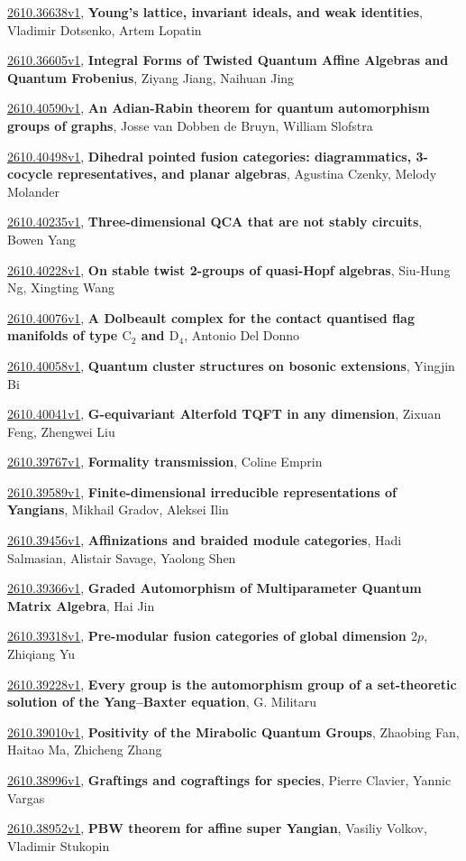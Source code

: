\documentclass[9pt, a4paper]{article}
\theoremstyle{plain}
\theoremstyle{definition}
\theoremstyle{remark}
\newcommand{\arxiv}[3]{\href{https://arxiv.org/abs/#1}{#1}, \textbf{\textcolor{arxivblue}{#2}}, #3}
\begin{document}
\arxiv{2610.36638v1}{Young's lattice, invariant ideals, and weak identities}{Vladimir Dotsenko, Artem Lopatin}

\arxiv{2610.36605v1}{Integral Forms of Twisted Quantum Affine Algebras and Quantum Frobenius}{Ziyang Jiang, Naihuan Jing}

\arxiv{2610.40590v1}{An Adian-Rabin theorem for quantum automorphism groups of graphs}{Josse van Dobben de Bruyn, William Slofstra}

\arxiv{2610.40498v1}{Dihedral pointed fusion categories: diagrammatics, 3-cocycle representatives, and planar algebras}{Agustina Czenky, Melody Molander}

\arxiv{2610.40235v1}{Three-dimensional QCA that are not stably circuits}{Bowen Yang}

\arxiv{2610.40228v1}{On stable twist 2-groups of quasi-Hopf algebras}{Siu-Hung Ng, Xingting Wang}

\arxiv{2610.40076v1}{A Dolbeault complex for the contact quantised flag manifolds of type $\mathrm{C}_{2}$ and $\mathrm{D}_{4}$}{Antonio Del Donno}

\arxiv{2610.40058v1}{Quantum cluster structures on bosonic extensions}{Yingjin Bi}

\arxiv{2610.40041v1}{G-equivariant Alterfold TQFT in any dimension}{Zixuan Feng, Zhengwei Liu}

\arxiv{2610.39767v1}{Formality transmission}{Coline Emprin}

\arxiv{2610.39589v1}{Finite-dimensional irreducible representations of Yangians}{Mikhail Gradov, Aleksei Ilin}

\arxiv{2610.39456v1}{Affinizations and braided module categories}{Hadi Salmasian, Alistair Savage, Yaolong Shen}

\arxiv{2610.39366v1}{Graded Automorphism of Multiparameter Quantum Matrix Algebra}{Hai Jin}

\arxiv{2610.39318v1}{Pre-modular fusion categories of global dimension $2p$}{Zhiqiang Yu}

\arxiv{2610.39228v1}{Every group is the automorphism group of a set-theoretic solution of the Yang--Baxter equation}{G. Militaru}

\arxiv{2610.39010v1}{Positivity of the Mirabolic Quantum Groups}{Zhaobing Fan, Haitao Ma, Zhicheng Zhang}

\arxiv{2610.38996v1}{Graftings and cograftings for species}{Pierre Clavier, Yannic Vargas}

\arxiv{2610.38952v1}{PBW theorem for affine super Yangian}{Vasiliy Volkov, Vladimir Stukopin}
\end{document}
